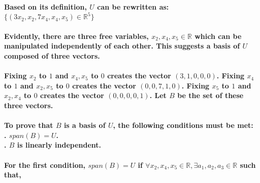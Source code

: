 \documentclass{article}
\begin{document}
\paragraph{\large
\\Based on its definition, $U$ can be rewritten as:
\\\indent $\{(3x_2,x_2,7x_4,x_4,x_5)\in \mathbb{R}^5\}$}

\paragraph{\large
Evidently, there are three free variables, $x_2,x_4,x_5 \in \mathbb{R}$ which can be manipulated independently of each other. This suggests a basis of $U$ composed of three vectors.}

\paragraph{\large
Fixing $x_2$ to $1$ and $x_4,x_5$ to $0$ creates the vector $(3, 1, 0, 0, 0)$.
Fixing $x_4$ to $1$ and $x_2,x_5$ to $0$ creates the vector $(0, 0, 7, 1, 0)$.
Fixing $x_5$ to $1$ and $x_2,x_4$ to $0$ creates the vector $(0,0,0,0,1)$.
Let $B$ be the set of these three vectors.}

\paragraph{\large
To prove that $B$ is a basis of $U$, the following conditions must be met:
\\. $span(B) = U$.
\\. $B$ is linearly independent.}

\paragraph{\large
For the first condition, $span(B) = U$ if $\forall x_2,x_4,x_5 \in \mathbb{R}, \exists a_1,a_2,a_3 \in \mathbb{R}$ such that,}
\end{document}
